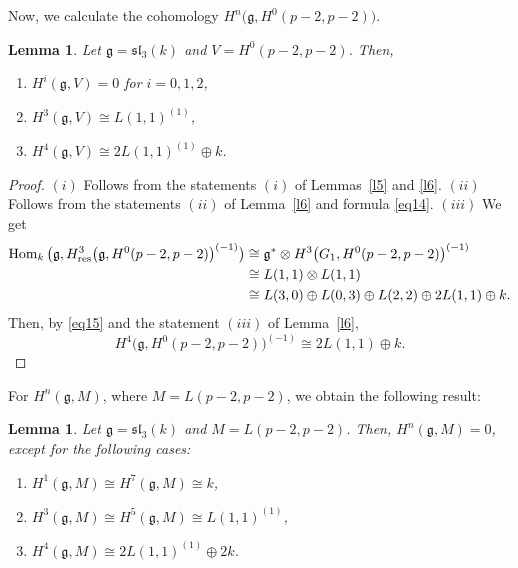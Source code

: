 \documentclass[10pt,a4paper]{amsart}
\numberwithin{equation}{section}
\newtheorem{Lemma}[Theorem]{Lemma}
\begin{document}
Now, we calculate the cohomology $H^n\big(\mathfrak{g},H^0(p-2,p-2)\big)$.

\begin{Lemma}\label{l7}
Let $\mathfrak{g}=\mathfrak{sl}_3(k)$ and $V=H^0(p-2,p-2)$. Then,
\begin{enumerate}\itemsep=0pt
\item[$(i)$] $H^{i}(\mathfrak{g},V)=0 $ for $i=0,1,2$,
\item[$(ii)$] $H^{3}(\mathfrak{g},V)\cong L(1,1)^{(1)}$,
\item[$(iii)$] $H^4(\mathfrak{g},V)\cong 2L(1,1)^{(1)}\oplus k$.
\end{enumerate}
\end{Lemma}

\begin{proof}
$(i)$ Follows from the statements $(i)$ of Lemmas~\ref{l5} and \ref{l6}.
$(ii)$ Follows from the statements $(ii)$ of Lemma~\ref{l6} and formula \eqref{eq14}.
$(iii)$ We get
\begin{align*}
\operatorname{Hom}_k\big(\mathfrak{g},H^3_{\rm res}\big(\mathfrak{g},H^0(p-2,p-2)\big)^{(-1)}\big)&\cong \mathfrak{g}^*\otimes H^3\big(G_1,H^0(p-2,p-2)\big)^{(-1)}
\\
&\cong L(1,1)\otimes L(1,1)
\\
&\cong
L(3,0)\oplus L(0,3)\oplus L(2,2)\oplus 2L(1,1)\oplus k.
\end{align*}
Then, by \eqref{eq15} and the statement $(iii)$ of Lemma~\ref{l6},
\begin{equation*} H^4\big(\mathfrak{g},H^0(p-2,p-2)\big)^{(-1)}\cong 2L(1,1)\oplus k.
\end{equation*}
\renewcommand{\qed}{}
\end{proof}

For $H^n(\mathfrak{g},M)$, where $M=L(p-2,p-2)$, we obtain the following result:

\begin{Lemma}\label{l8}
Let $\mathfrak{g}=\mathfrak{sl}_3(k)$ and $M=L(p-2,p-2)$. Then, $H^n(\mathfrak{g},M)=0$, except for the following cases:

\begin{enumerate}\itemsep=0pt

\item[$(i)$] $H^{1}(\mathfrak{g},M)\cong H^{7}(\mathfrak{g},M)\cong k$,

\item[$(ii)$] $H^{3}(\mathfrak{g},M)\cong H^{5}(\mathfrak{g},M)\cong L(1,1)^{(1)}$,

\item[$(iii)$] $H^4(\mathfrak{g},M)\cong 2L(1,1)^{(1)}\oplus 2k$.

\end{enumerate}
\end{Lemma}
\end{document}
